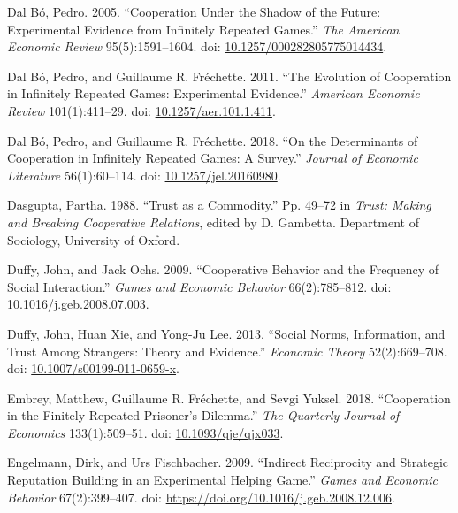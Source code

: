 \documentclass[
  11pt,
]{article}
\newlength{\cslhangindent}
\newlength{\cslentryspacingunit} %
\newenvironment{CSLReferences}[2] %
 {%
  \setlength{\parindent}{0pt}
  \ifodd #1
  \let\oldpar\par
  \def\par{\hangindent=\cslhangindent\oldpar}
  \fi
  \setlength{\parskip}{#2\cslentryspacingunit}
 }%
 {}
\begin{document}
\begin{CSLReferences}{1}{0}
\leavevmode{}%
Dal Bó, Pedro. 2005. {``Cooperation Under the Shadow of the Future: Experimental Evidence from Infinitely Repeated Games.''} \emph{The American Economic Review} 95(5):1591--1604. doi: \href{https://doi.org/10.1257/000282805775014434}{10.1257/000282805775014434}.

\leavevmode{}%
Dal Bó, Pedro, and Guillaume R. Fréchette. 2011. {``The Evolution of Cooperation in Infinitely Repeated Games: Experimental Evidence.''} \emph{American Economic Review} 101(1):411--29. doi: \href{https://doi.org/10.1257/aer.101.1.411}{10.1257/aer.101.1.411}.

\leavevmode{}%
Dal Bó, Pedro, and Guillaume R. Fréchette. 2018. {``On the Determinants of Cooperation in Infinitely Repeated Games: A Survey.''} \emph{Journal of Economic Literature} 56(1):60--114. doi: \href{https://doi.org/10.1257/jel.20160980}{10.1257/jel.20160980}.

\leavevmode{}%
Dasgupta, Partha. 1988. {``Trust as a Commodity.''} Pp. 49--72 in \emph{Trust: {M}aking and {B}reaking {C}ooperative {R}elations}, edited by D. Gambetta. Department of Sociology, University of Oxford.

\leavevmode{}%
Duffy, John, and Jack Ochs. 2009. {``Cooperative Behavior and the Frequency of Social Interaction.''} \emph{Games and Economic Behavior} 66(2):785--812. doi: \href{https://doi.org/10.1016/j.geb.2008.07.003}{10.1016/j.geb.2008.07.003}.

\leavevmode{}%
Duffy, John, Huan Xie, and Yong-Ju Lee. 2013. {``Social Norms, Information, and Trust Among Strangers: Theory and Evidence.''} \emph{Economic Theory} 52(2):669--708. doi: \href{https://doi.org/10.1007/s00199-011-0659-x}{10.1007/s00199-011-0659-x}.

\leavevmode{}%
Embrey, Matthew, Guillaume R. Fréchette, and Sevgi Yuksel. 2018. {``{Cooperation in the Finitely Repeated Prisoner's Dilemma}.''} \emph{The Quarterly Journal of Economics} 133(1):509--51. doi: \href{https://doi.org/10.1093/qje/qjx033}{10.1093/qje/qjx033}.

\leavevmode{}%
Engelmann, Dirk, and Urs Fischbacher. 2009. {``Indirect Reciprocity and Strategic Reputation Building in an Experimental Helping Game.''} \emph{Games and Economic Behavior} 67(2):399--407. doi: \url{https://doi.org/10.1016/j.geb.2008.12.006}.


\end{CSLReferences}
\end{document}
